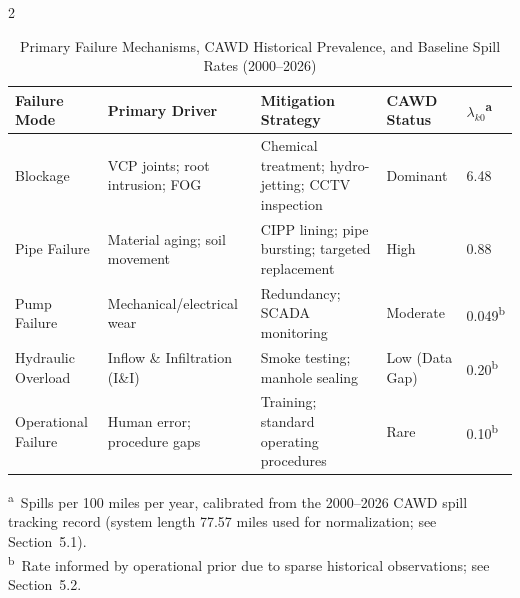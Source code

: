 \documentclass[10pt]{article}
\begin{document}
\begin{multicols}{2}
\begin{table}[t]
\centering
\caption{Primary Failure Mechanisms, CAWD Historical Prevalence, and
         Baseline Spill Rates (2000--2026)}
\label{tab:failure-mechanisms}
\begin{tabular}{p{2.2cm} p{3.0cm} p{3.5cm} p{2.0cm} p{2.0cm}}
\toprule
\textbf{Failure Mode} & \textbf{Primary Driver} & \textbf{Mitigation Strategy}
  & \textbf{CAWD Status} & \textbf{$\lambda_{k0}$\textsuperscript{a}} \\
\midrule
Blockage
  & VCP joints; root intrusion; FOG
  & Chemical treatment; hydro-jetting; CCTV inspection
  & Dominant
  & 6.48 \\[4pt]
Pipe Failure
  & Material aging; soil movement
  & CIPP lining; pipe bursting; targeted replacement
  & High
  & 0.88 \\[4pt]
Pump Failure
  & Mechanical/electrical wear
  & Redundancy; SCADA monitoring
  & Moderate
  & 0.049\textsuperscript{b} \\[4pt]
Hydraulic Overload
  & Inflow \& Infiltration (I\&I)
  & Smoke testing; manhole sealing
  & Low (Data Gap)
  & 0.20\textsuperscript{b} \\[4pt]
Operational Failure
  & Human error; procedure gaps
  & Training; standard operating procedures
  & Rare
  & 0.10\textsuperscript{b} \\
\bottomrule
\end{tabular}
\smallskip
 
\noindent\footnotesize
\textsuperscript{a}~Spills per 100 miles per year, calibrated from the
2000--2026 CAWD spill tracking record (system length 77.57 miles used
for normalization; see Section~5.1).\\
\textsuperscript{b}~Rate informed by operational prior due to sparse
historical observations; see Section~5.2.
\end{table}
 

\end{multicols}
\end{document}
